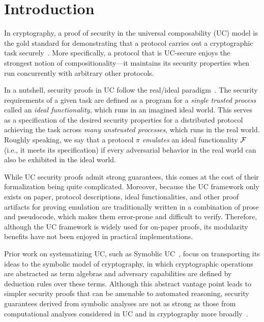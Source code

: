 \section{Introduction}
\label{sec:introduction}

In cryptography, a proof of security in the universal composability (UC) model
is the gold standard for demonstrating that a protocol carries out a
cryptographic task securely~\cite{canetti2001universally}. More specifically, a
protocol that is UC-secure enjoys the strongest notion of compositionality---it
maintains its security properties when run concurrently with arbitrary other
protocols.

In a nutshell, security proofs in UC follow the real/ideal
paradigm~\cite{goldreich1987play}. The security requirements of a given task are
defined as a program for a \emph{single trusted process} called an \emph{ideal
  functionality}, which runs in an imagined ideal world. This serves as a
specification of the desired security properties for a distributed protocol
achieving the task across \emph{many unstrusted processes}, which runs in the
real world. Roughly speaking, we say that a protocol $\pi$ \emph{emulates} an
ideal functionality $\mathcal{{F}}$ (i.e., it meets its specification) if every
adversarial behavior in the real world can also be exhibited in the ideal world.

While UC security proofs admit strong guarantees, this comes at the cost of
their formalization being quite complicated. Moreover, because the UC framework
only exists on paper, protocol descriptions, ideal functionalities, and other
proof artifacts for proving emulation are traditionally written in a combination
of prose and pseudocode, which makes them error-prone and difficult to
verify. Therefore, although the UC framework is widely used for on-paper proofs,
its modularity benefits have not been enjoyed in practical implementations.

Prior work on systematizing UC, such as Symoblic UC~\cite{bohl2016symbolic},
focus on transporting its ideas to the symbolic model of cryptography, in which
cryptographic operations are abstracted as term algebras and adversary
capabilities are defined by deduction rules over these terms. Although this
abstract vantage point leads to simpler security proofs that can be amenable to
automated reasoning, security guarantees derived from symbolic analyses are not
as strong as those from computational analyses considered in UC and in
cryptography more broadly~\cite{cortier2011survey}.

